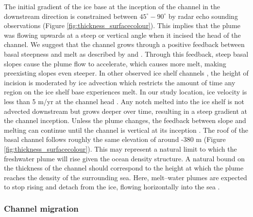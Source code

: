 The initial gradient of the ice base at the inception of the channel in the downstream direction is constrained between $45^{\circ}-90^{\circ}$ by radar echo sounding observations (Figure \ref{fig:thickness_surfacecolour}).  This implies that the plume was flowing upwards at a steep or vertical angle when it incised the head of the channel. We suggest that the channel grows through a positive feedback between basal steepness and melt as described by \cite{sergienko2013basal} and \cite{gladish2012ice}. Through this feedback, steep basal slopes cause the plume flow to accelerate, which causes more melt, making preexisting slopes even steeper. 
In other observed ice shelf channels \cite [e.g.][] {drews2017actively, jeofry2018hard}, the height of incision is moderated by ice advection which restricts the amount of time any region on the ice shelf base experiences melt. 
In our study location, ice velocity is less than 5 m/yr at the channel head \citep{rignot2017measures}. Any notch melted into the ice shelf is not advected downstream but grows deeper over time, resulting in a steep gradient at the channel inception. Unless the plume changes, the feedback between slope and melting can continue until the channel is vertical at its inception \citep{sergienko2013basal,gladish2012ice}. The roof of the basal channel follows roughly the same elevation of around -380 m (Figure \ref{fig:thickness_surfacecolour}). This may represent a natural limit to which the freshwater plume will rise given the ocean density structure. A natural bound on the thickness of the channel should correspond to the height at which the plume reaches the density of the surrounding sea. Here, melt--water plumes are expected to stop rising and detach from the ice, flowing horizontally into the sea \citep{jenkins2011convection, hewitt2020subglacial}.


\subsubsection{Channel migration} \label{sec:side_melt}


